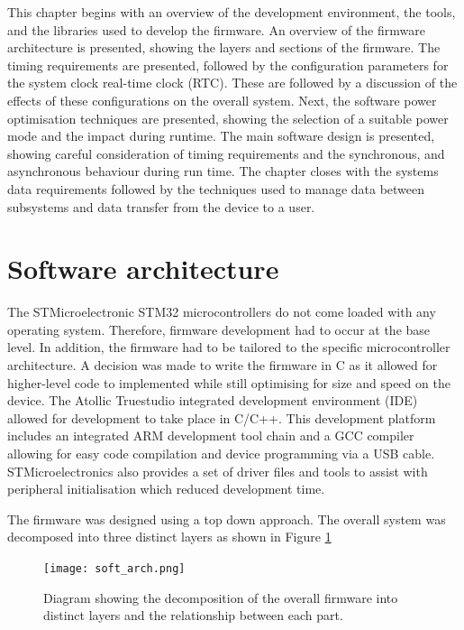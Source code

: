 This chapter begins with an overview of the development environment, the tools, and the libraries used to develop the firmware.  An overview of the firmware architecture is presented, showing the layers and sections of the firmware. The timing requirements are presented, followed by the configuration parameters for the system clock real-time clock (RTC). These are followed by a discussion of the effects of these configurations on the overall system. Next, the software power optimisation techniques are presented, showing the selection of a suitable power mode and the impact during runtime. The main software design is presented, showing careful consideration of timing requirements and the synchronous, and asynchronous behaviour during run time. The chapter closes with the systems data requirements followed by the techniques used to manage data between subsystems and data transfer from the device to a user.

\section{Software architecture}

The STMicroelectronic STM32 microcontrollers do not come loaded with any operating system. Therefore, firmware development had to occur at the base level. In addition, the firmware had to be tailored to the specific microcontroller architecture. A decision was made to write the firmware in C as it allowed for higher-level code to implemented while still optimising for size and speed on the device. The Atollic Truestudio  integrated development environment (IDE) allowed for development to take place in C/C++. This development platform includes an  integrated ARM development tool chain and a GCC compiler allowing for easy code compilation and device programming via a USB cable. STMicroelectronics also provides a set of driver files and tools to assist with peripheral initialisation which reduced development time. \par 

The firmware was designed using a top down approach. The overall system was decomposed into three distinct layers as shown in Figure \ref{fig:soft_arch}

\begin{figure}[H]
	\centering
	\texttt{[image: soft\_arch.png]}
	\caption{Diagram showing the decomposition of the overall firmware into distinct layers and the relationship between each part.}
	\label{fig:soft_arch}
\end{figure}

